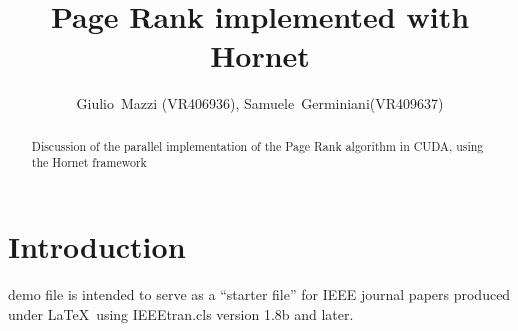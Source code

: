 \documentclass[journal]{IEEEtran}
\begin{document}
\title{Page Rank implemented with Hornet}
\author{Giulio~Mazzi (VR406936), Samuele~Germiniani(VR409637)}

\markboth{}%
{}
\maketitle

\begin{abstract}
Discussion of the parallel implementation of the Page Rank algorithm 
in CUDA, using the Hornet framework
\end{abstract}

\section{Introduction}
 demo file is intended to serve as a ``starter file''
for IEEE journal papers produced under \LaTeX\ using
IEEEtran.cls version 1.8b and later.

\end{document}
